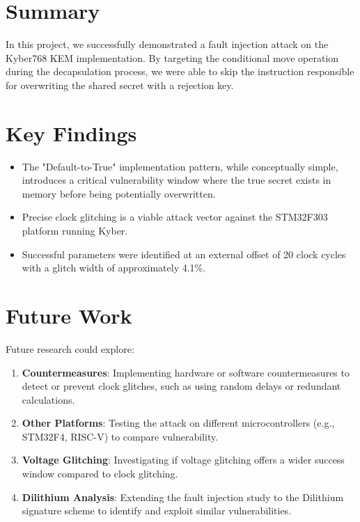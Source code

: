 \section{Summary}
In this project, we successfully demonstrated a fault injection attack on the Kyber768 KEM implementation. By targeting the conditional move operation during the decapsulation process, we were able to skip the instruction responsible for overwriting the shared secret with a rejection key.

\section{Key Findings}
\begin{itemize}
    \item The "Default-to-True" implementation pattern, while conceptually simple, introduces a critical vulnerability window where the true secret exists in memory before being potentially overwritten.
    \item Precise clock glitching is a viable attack vector against the STM32F303 platform running Kyber.
    \item Successful parameters were identified at an external offset of 20 clock cycles with a glitch width of approximately 4.1\%.
\end{itemize}

\section{Future Work}
Future research could explore:
\begin{enumerate}
    \item \textbf{Countermeasures}: Implementing hardware or software countermeasures to detect or prevent clock glitches, such as using random delays or redundant calculations.
    \item \textbf{Other Platforms}: Testing the attack on different microcontrollers (e.g., STM32F4, RISC-V) to compare vulnerability.
    \item \textbf{Voltage Glitching}: Investigating if voltage glitching offers a wider success window compared to clock glitching.
    \item \textbf{Dilithium Analysis}: Extending the fault injection study to the Dilithium signature scheme to identify and exploit similar vulnerabilities.
\end{enumerate}
